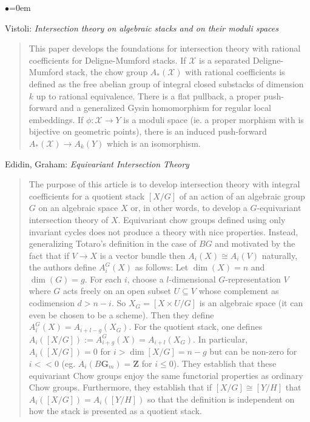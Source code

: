 \begin{list}{$\bullet$}{\leftmargin=0em}
\item
Vistoli: \emph{Intersection theory on algebraic stacks and on their moduli 
spaces} \cite{vistoli_intersection}
\begin{quote}
This paper develops the foundations for intersection theory with rational 
coefficients for Deligne-Mumford stacks. If $\mathcal{X}$ is a separated 
Deligne-Mumford stack, the chow group $A_*(\mathcal{X})$ with rational 
coefficients is 
defined as the free abelian group of integral closed substacks of dimension $k$ 
up to rational equivalence. There is a flat pullback, a proper push-forward 
and a generalized Gysin homomorphism for regular local embeddings. If $\phi: 
\mathcal{X} \to Y$ is a moduli space (ie. a proper morphism with is bijective 
on 
geometric points), there is an induced push-forward $A_*(\mathcal{X}) \to 
A_k(Y)$ 
which is an isomorphism. 
\end{quote}
\smallskip
\item Edidin, Graham: \emph{Equivariant Intersection Theory} 
\cite{edidin-graham}
\begin{quote}
The purpose of this article is to develop intersection theory with integral 
coefficients for a quotient stack $[X/G]$ of an action of an algebraic group 
$G$ on an algebraic space $X$ or, in other words, to develop a $G$-equivariant 
intersection theory of $X$. Equivariant chow groups defined using only 
invariant cycles does not produce a theory with nice properties. Instead, 
generalizing Totaro's definition in the case of $BG$ and motivated by the fact 
that if $V \to X$ is a vector bundle then $A_i(X) \cong A_i(V)$ naturally, the 
authors define $A_i^G(X)$ as follows:
Let $\dim(X) = n$ and $\dim(G) = g$. For each $i$, choose a $l$-dimensional 
$G$-representation $V$ where $G$ acts freely on an open subset $U \subseteq V$ 
whose complement as codimension $d > n-i$. So $X_G= [X \times U / G]$ is an 
algebraic space (it can even be chosen to be a scheme). Then they define 
$A_i^G(X) = A_{i+l-g}(X_G)$. For the quotient stack, one defines $A_i( [X/G]) 
:= A_{i+g}^G(X) = A_{i+l}(X_G)$. In particular, $A_i([X/G]) = 0$ for $i > \dim 
[X/G] = n - g$ but can be non-zero for $i << 0$ (eg. $A_i(B \mathbf{G}_m) = 
\mathbf{Z}$ for 
$i \le 0$).
They establish that these equivariant Chow groups enjoy the same functorial 
properties as ordinary Chow groups. Furthermore, they establish that if $[X / 
G] \cong [Y / H]$ that $A_i([X/G]) = A_i([Y/H])$ so that the definition is 
independent on how the stack is presented as a quotient stack.

\end{quote}
\end{list}
